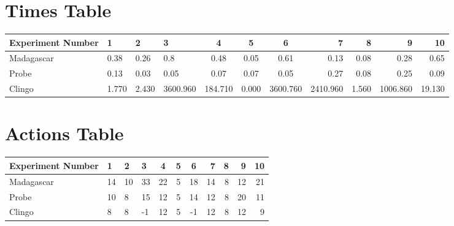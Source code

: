 \documentclass[8pt]{article}
\begin{document}
\begin{landscape}
\section{Times Table}\begin{tabular}{ | l | l | l | l | c | c | c | r | r | r | r | }\hline
Experiment Number & 1 & 2 & 3 & 4 & 5 & 6 & 7 & 8 & 9 & 10\\  \hline
Madagascar & 0.38 & 0.26 & 0.8 & 0.48 & 0.05 & 0.61 & 0.13 & 0.08 & 0.28 & 0.65\\  \hline
Probe & 0.13 & 0.03 & 0.05 & 0.07 & 0.07 & 0.05 & 0.27 & 0.08 & 0.25 & 0.09\\  \hline
Clingo & 1.770 & 2.430 & 3600.960 & 184.710 & 0.000 & 3600.760 & 2410.960 & 1.560 & 1006.860 & 19.130\\  \hline
\end{tabular}
\section{Actions Table}\begin{tabular}{ | l | l | l | l | c | c | c | r | r | r | r | }\hline
Experiment Number & 1 & 2 & 3 & 4 & 5 & 6 & 7 & 8 & 9 & 10\\ \hline
 Madagascar & 14 & 10 & 33 & 22 & 5 & 18 & 14 & 8 & 12 & 21\\ \hline
 Probe & 10 & 8 & 15 & 12 & 5 & 14 & 12 & 8 & 20 & 11\\ \hline
 Clingo & 8 & 8 & -1 & 12 & 5 & -1 & 12 & 8 & 12 & 9\\ \hline
\end{tabular}
\end{landscape}
\end{document}

